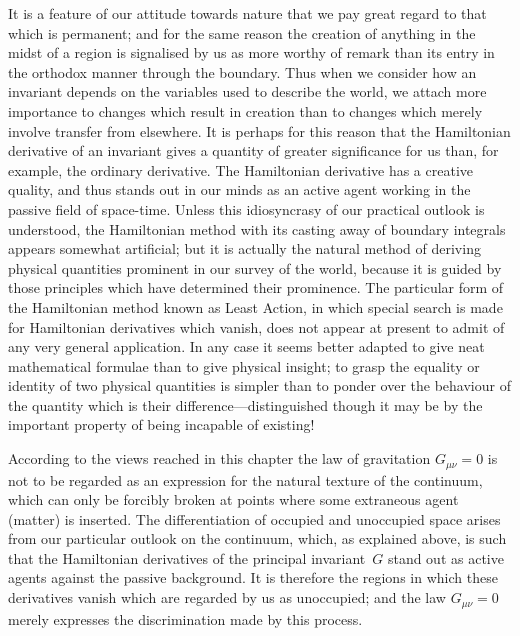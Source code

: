 \documentclass[12pt]{book}
\begin{document}
It is a feature of our attitude towards nature that we pay great regard to
%
%
%
that which is permanent; and for the same reason the creation of anything
%
in the midst of a region is signalised by us as more worthy of remark than
its entry in the orthodox manner through the boundary. Thus when we
consider how an invariant depends on the variables used to describe the
world, we attach more importance to changes which result in creation than
to changes which merely involve transfer from elsewhere. It is perhaps for
this reason that the Hamiltonian derivative of an invariant gives a quantity
%
of greater significance for us than, for example, the ordinary derivative. The
Hamiltonian derivative has a creative quality, and thus stands out in our
minds as an active agent working in the passive field of space-time. Unless
this idiosyncrasy of our practical outlook is understood, the Hamiltonian
method with its casting away of boundary integrals appears somewhat artificial;
but it is actually the natural method of deriving physical quantities
prominent in our survey of the world, because it is guided by those principles
which have determined their prominence. The particular form of the
Hamiltonian method known as Least Action, in which special search is made
%
for Hamiltonian derivatives which vanish, does not appear at present to admit
of any very general application. In any case it seems better adapted to give
neat mathematical formulae than to give physical insight; to grasp the
equality or identity of two physical quantities is simpler than to ponder over
the behaviour of the quantity which is their difference---distinguished though
it may be by the important property of being incapable of existing!

According to the views reached in this chapter the law of gravitation
$G_{\mu\nu} = 0$ is not to be regarded as an expression for the natural texture of the
continuum, which can only be forcibly broken at points where some extraneous
agent (matter) is inserted. The differentiation of occupied and unoccupied
space arises from our particular outlook on the continuum, which, as explained
above, is such that the Hamiltonian derivatives of the principal invariant~$G$
stand out as active agents against the passive background. It is therefore
the regions in which these derivatives vanish which are regarded by us as
unoccupied; and the law $G_{\mu\nu} = 0$ merely expresses the discrimination made
by this process.
\end{document}
